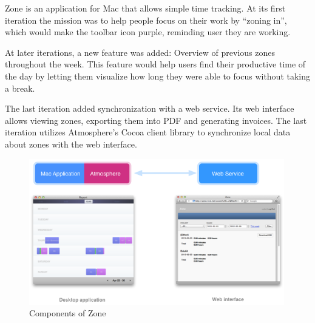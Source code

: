 Zone is an application for Mac that allows simple time tracking. At its first iteration the mission was to help people focus on their work by ``zoning in'', \citep{zone_app} which would make the toolbar icon purple, reminding user they are working.

At later iterations, a new feature was added: Overview of previous zones throughout the week. This feature would help users find their productive time of the day by letting them visualize how long they were able to focus without taking a break.

The last iteration added synchronization with a web service. Its web interface allows viewing zones, exporting them into PDF and generating invoices. The last iteration utilizes Atmosphere's Cocoa client library to synchronize local data about zones with the web interface.

\begin{figure}[htbp]
  \centering
    \includegraphics[height=2.5in]{figures/ZoneDiagram.png}
  \caption{Components of Zone}
  \label{fig:figures_ZoneDiagram}
\end{figure}